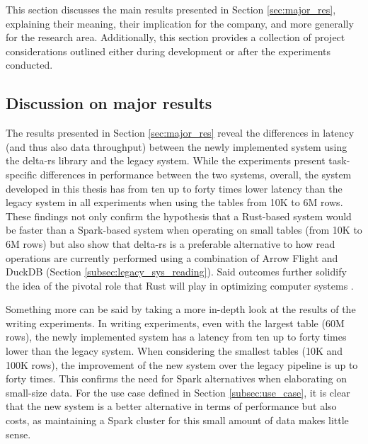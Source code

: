 This section discusses the main results presented in Section \ref{sec:major_res}, explaining their meaning, their implication for the company, and more generally for the research area. Additionally, this section provides a collection of project considerations outlined either during development or after the experiments conducted.

\subsection{Discussion on major results}

The results presented in Section \ref{sec:major_res} reveal the differences in latency (and thus also data throughput) between the newly implemented system using the delta-rs library and the legacy system. While the experiments present task-specific differences in performance between the two systems, overall, the system developed in this thesis has from ten up to forty times lower latency than the legacy system in all experiments when using the tables from 10K to 6M rows. These findings not only confirm the hypothesis that a Rust-based system would be faster than a Spark-based system when operating on small tables (from 10K to 6M rows) but also show that delta-rs is a preferable alternative to how read operations are currently performed using a combination of Arrow Flight and DuckDB (Section \ref{subsec:legacy_sys_reading}). Said outcomes further solidify the idea of the pivotal role that Rust will play in optimizing computer systems \cite{Balasub2017}.

Something more can be said by taking a more in-depth look at the results of the writing experiments. In writing experiments, even with the largest table (60M rows), the newly implemented system has a latency from ten up to forty times lower than the legacy system. When considering the smallest tables (10K and 100K rows), the improvement of the new system over the legacy pipeline is up to forty times. This confirms the need for Spark alternatives when elaborating on small-size data. For the use case defined in Section \ref{subsec:use_case}, it is clear that the new system is a better alternative in terms of performance but also costs, as maintaining a Spark cluster for this small amount of data makes little sense. 

